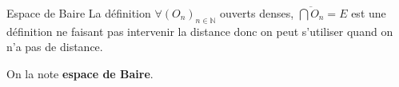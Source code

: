 \begin{Definition}[colbacktitle=red!75!black]{Espace de Baire}{}
La définition $\forall (O_n) _{n \in \mathbb{N}}$ ouverts denses, $\overline{\bigcap O_n} = E$ est une définition ne faisant pas intervenir la distance donc on peut s'utiliser quand on n'a pas de distance. 

On la note \textbf{espace de Baire}. 
\end{Definition}






